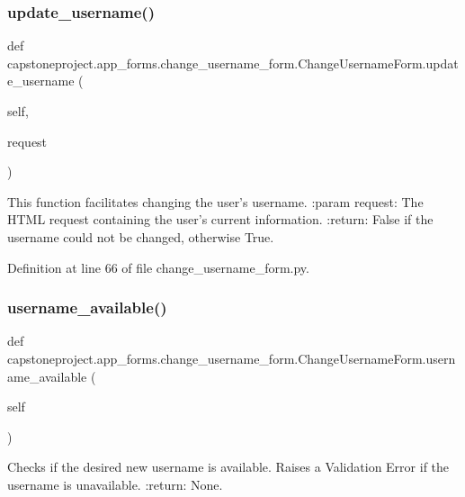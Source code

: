 \subsubsection{\texorpdfstring{update\+\_\+username()}{update\_username()}}
{\footnotesize\ttfamily def capstoneproject.\+app\+\_\+forms.\+change\+\_\+username\+\_\+form.\+Change\+Username\+Form.\+update\+\_\+username (\begin{DoxyParamCaption}\item[{}]{self,  }\item[{}]{request }\end{DoxyParamCaption})}

\begin{DoxyVerb}This function facilitates changing the user's username.
:param request: The HTML request containing the user's current information.
:return: False if the username could not be changed, otherwise True.
\end{DoxyVerb}
 

Definition at line 66 of file change\+\_\+username\+\_\+form.\+py.

\mbox{\label{classcapstoneproject_1_1app__forms_1_1change__username__form_1_1_change_username_form_af8ac9857d82522799b9955f544166490}} 
\subsubsection{\texorpdfstring{username\+\_\+available()}{username\_available()}}
{\footnotesize\ttfamily def capstoneproject.\+app\+\_\+forms.\+change\+\_\+username\+\_\+form.\+Change\+Username\+Form.\+username\+\_\+available (\begin{DoxyParamCaption}\item[{}]{self }\end{DoxyParamCaption})}

\begin{DoxyVerb}Checks if the desired new username is available. Raises a Validation Error if the username is unavailable.
:return: None.
\end{DoxyVerb}
 

